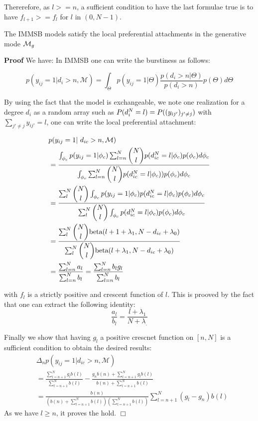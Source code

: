 Thererefore, as $l >=n$, a sufficient condition to have the last formulae true is to have $f_{l+1} >= f_l$ for $l$ in $(0, N-1)$. 


\begin{proposition}
	The IMMSB models satisfy the local preferential attachments in the generative mode $\mathcal{M}_g$
\end{proposition}

\noindent \textbf{Proof} We have:
In IMMSB one can write the burstiness as follows:

\begin{equation} 
p(y_{ij} = 1 | d_i>n, \mathcal{M}) = \int_{\Theta} p(y_{ij}=1|\Theta) \frac{p(d_i>n | \Theta)}{p(d_i>n)} p(\Theta) d\Theta \nonumber
\end{equation}

By using the fact that the model is exchangeable, we note one realization for a degree $d_i$ as a random array such as $P(d_i^N=l) = P((y_{ij'})_{j'\neq j})$ with $\sum_{j'\neq j}y_{ij'} = l$, one can write the local preferential attachment:

\begin{align} \label{eq:sum}
&p(y_{ij} = 1 | d_{ic}>n, \mathcal{M}) \nonumber \\
&=  \frac{ \int_{\phi_{c}} p(y_{ij}=1|\phi_{c})\sum_{l=n}^N\dbinom{N}{l} p(d_{ic}^N=l | \phi_{c}) p(\phi_{c}) d\phi_{c}}{\int_{\phi_{c}}\sum_{l=n}^N \dbinom{N}{l}p(d_{ic}^N=l | \phi_{c}))       p(\phi_{c}) d\phi_{c}}  \nonumber \\
&= \frac{\sum_l^N\dbinom{N}{l} \int_{\phi_{c}} p(y_{ij}=1|\phi_{c}) p(d_{ic}^N=l | \phi_{c}) p(\phi_{c}) d\phi_{c} }{\sum_l^N \dbinom{N}{l}\int_{\phi_{c}} p(d_{ic}^N=l | \phi_{c}) p(\phi_{c}) d\phi_{c} } \nonumber\\
&= \frac{\sum_l^N\dbinom{N}{l} \text{beta}(l+1+\lambda_1, N-d_{ic}+\lambda_0) }{\sum_l^N \dbinom{N}{l}\text{beta}(l+\lambda_1, N-d_{ic}+\lambda_0) } \nonumber\\
&=  \frac{\sum_{l=n}^N a_l}{\sum_{l=n}^N b_l}= \frac{\sum_{l=n}^N b_l g_l}{\sum_{l=n}^N b_l} \nonumber
\end{align}

with $f_l$ is a strictly positive and crescent function of $l$. This is prooved by the fact that one can extract the following identity:
\begin{equation}
\frac{a_l}{b_l} = \frac{l+\lambda_1}{N+\lambda_.} \nonumber
\end{equation}

Finally we show that having $g_l$ a positive crescnet function on $[n, N]$ is a sufficient condition to obtain the desired results:
\begin{align}
&\Delta_n p(y_{ij} = 1 | d_{ic}>n, \mathcal{M}) \nonumber \\
&= \frac{\sum_{l=n+1}^N g_l b(l)}{\sum_{l=n+1}^N b(l)} - \frac{g_n b(n) + \sum_{l=n+1}^N g_l b(l)}{b(n) + \sum_{l=n+1}^N b(l)} \nonumber\\
&= \frac{b(n)}{\left(b(n) + \sum_{l=n+1}^N b(l)\right) \left(\sum_{l=n+1}^N b(l)\right)} \sum_{l=n+1}^N (g_l-g_n)b(l) \nonumber
\end{align}
As we have $l \geq n$, it proves the hold. \hfill$\Box$ \\


